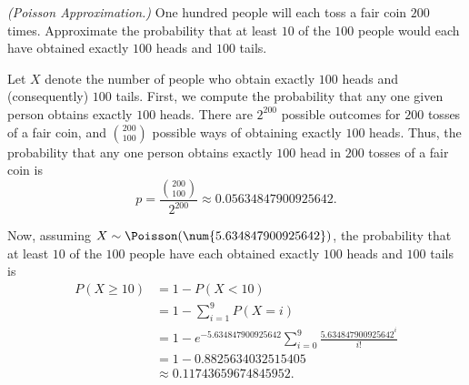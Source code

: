 \begin{problem}[Handout 10, \# 4]
  \emph{(Poisson Approximation.)} One hundred people will each toss a fair
  coin \(200\) times. Approximate the probability that at least \(10\) of
  the \(100\) people would each have obtained exactly \(100\) heads and
  \(100\) tails.
\end{problem}
\begin{solution}
  Let \(X\) denote the number of people who obtain exactly \(100\) heads
  and (consequently) \(100\) tails. First, we compute the probability that
  any one given person obtains exactly \(100\) heads. There are \(2^{200}\)
  possible outcomes for \(200\) tosses of a fair coin, and
  \(\binom{200}{100}\) possible ways of obtaining exactly \(100\)
  heads. Thus, the probability that any one person obtains exactly \(100\)
  head in \(200\) tosses of a fair coin is
  \[
    p=\frac{\binom{200}{100}}{2^{200}}\approx\num{0.05634847900925642}.
  \]

  Now, assuming \(X\sim\Poisson(\num{5.634847900925642})\), the
  probability that at least \(10\) of the \(100\) people have each obtained
  exactly \(100\) heads and \(100\) tails is
  \begin{align*}
    P(X\geq 10)
    &=1-P(X<10)\\
    &=1-\sum_{i=1}^9 P(X=i)\\
    &=1
      -e^{-\num{5.634847900925642}}
      \sum_{i=0}^9\frac{\num{5.634847900925642}^i}{i!}\\
    &=1-\num{0.8825634032515405}\\
    &\approx \num{0.11743659674845952}.
  \end{align*}
\end{solution}
\newpage

